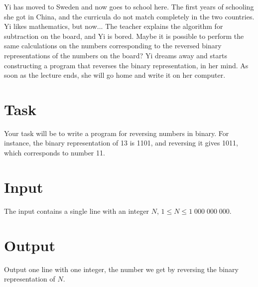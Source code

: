 
Yi has moved to Sweden and now goes to school here. The first years of schooling she got in China, and the curricula do not match completely in the two countries. Yi likes mathematics, but now... The teacher explains the algorithm for subtraction on the board, and Yi is bored. Maybe it is possible to perform the same calculations on the numbers corresponding to the reversed binary representations of the numbers on the board? Yi dreams away and starts constructing a program that reverses the binary representation, in her mind. As soon as the lecture ends, she will go home and write it on her computer.

\section*{Task}
Your task will be to write a program for reversing numbers in binary. For instance, the binary representation of 13 is 1101, and reversing it gives 1011, which corresponds to number 11.

\section*{Input}
The input contains a single line with an integer $N$, $1 \leq N \leq 1\;000\;000\;000$.

\section*{Output}
Output one line with one integer, the number we get by reversing the binary representation of $N$.
